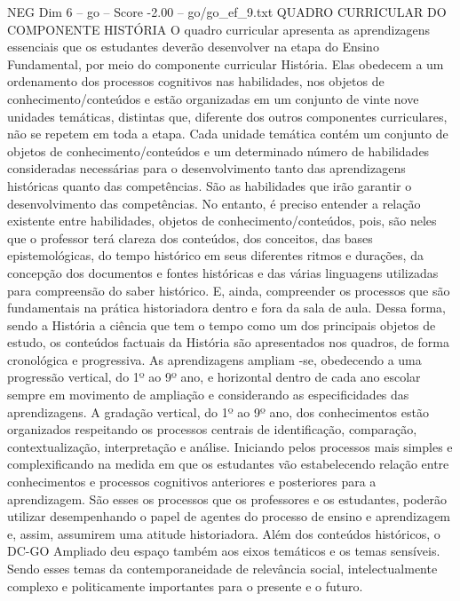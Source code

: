 \begin{textsample}{NEG Dim 6 – go – Score -2.00 – go/go\_ef\_9.txt}  \label{ex:f6_neg_173}
QUADRO CURRICULAR DO COMPONENTE HISTÓRIA O quadro curricular apresenta as aprendizagens essenciais que os estudantes deverão desenvolver na etapa do Ensino Fundamental, por meio do componente curricular História.
Elas obedecem a um ordenamento dos processos cognitivos nas habilidades, nos objetos de conhecimento/conteúdos e estão organizadas em um conjunto de vinte nove unidades temáticas, distintas que, diferente dos outros componentes curriculares, não se repetem em toda a etapa.
Cada unidade temática contém um conjunto de objetos de conhecimento/conteúdos e um determinado número de habilidades consideradas necessárias para o desenvolvimento tanto das aprendizagens históricas quanto das competências.
São as habilidades que irão garantir o desenvolvimento das competências.
No entanto, é preciso entender a relação existente entre habilidades, objetos de conhecimento/conteúdos, pois, são neles que o professor terá clareza dos conteúdos, dos conceitos, das bases epistemológicas, do tempo histórico em seus diferentes ritmos e durações, da concepção dos documentos e fontes históricas e das várias linguagens utilizadas para compreensão do saber histórico.
E, ainda, compreender os processos que são fundamentais na prática historiadora dentro e fora da sala de aula.
Dessa forma, sendo a História a ciência que tem o tempo como um dos principais objetos de estudo, os conteúdos factuais da História são apresentados nos quadros, de forma cronológica e progressiva.
As aprendizagens ampliam -se, obedecendo a uma progressão vertical, do 1º ao 9º ano, e horizontal dentro de cada ano escolar sempre em movimento de ampliação e considerando as especificidades das aprendizagens.
A gradação vertical, do 1º ao 9º ano, dos conhecimentos estão organizados respeitando os processos centrais de identificação, comparação, contextualização, interpretação e análise.
Iniciando pelos processos mais simples e complexificando na medida em que os estudantes vão estabelecendo relação entre conhecimentos e processos cognitivos anteriores e posteriores para a aprendizagem.
São esses os processos que os professores e os estudantes, poderão utilizar desempenhando o papel de agentes do processo de ensino e aprendizagem e, assim, assumirem uma atitude historiadora.
Além dos conteúdos históricos, o DC-GO Ampliado deu espaço também aos eixos temáticos e os temas sensíveis.
Sendo esses temas da contemporaneidade de relevância social, intelectualmente complexo e politicamente importantes para o presente e o futuro.

\end{textsample}
